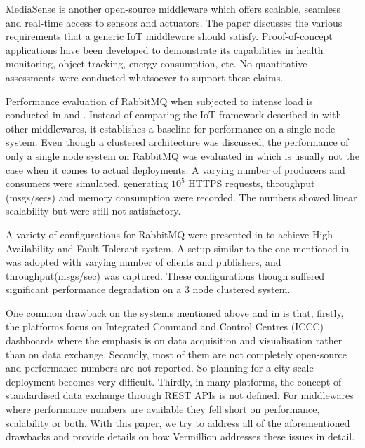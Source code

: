\documentclass[conference, 10pt]{IEEEtran}
\begin{document}
MediaSense \cite{kanter2012mediasense} is another open-source middleware which offers scalable, seamless and real-time access to sensors and actuators. The paper discusses the various requirements that a generic IoT middleware should satisfy. Proof-of-concept applications have been developed to demonstrate its capabilities in health monitoring, object-tracking, energy consumption, etc. No quantitative assessments were conducted whatsoever to support these claims. 

Performance evaluation of RabbitMQ when subjected to intense load is conducted in \cite{vandikas2014performance} and \cite{rostanski2014evaluation}. Instead of comparing the IoT-framework described in \cite{vandikas2014performance} with other middlewares, it establishes a baseline for performance on a single node system. 
Even though a clustered architecture was discussed, the performance of only a single node system on RabbitMQ was evaluated in \cite{vandikas2014performance} which is usually not the case when it comes to actual deployments. A varying number of producers and consumers were simulated, generating $10^5$ HTTPS requests, throughput (msgs/secs)  and memory consumption were recorded. The numbers showed linear scalability but were still not satisfactory.

A variety of configurations for RabbitMQ were presented in\cite{rostanski2014evaluation} to achieve High Availability and Fault-Tolerant system. A setup similar to the one mentioned in \cite{vandikas2014performance} was adopted with varying number of clients and publishers, and throughput(msgs/sec) was captured. These configurations though suffered significant performance degradation on a 3 node clustered system.

One common drawback on the systems mentioned above and in \cite{ray2016survey,farahzadi2018middleware} is that, firstly, the platforms focus on Integrated Command and Control Centres (ICCC) dashboards where the emphasis is on data acquisition and visualisation rather than on data exchange. Secondly, most of them are not completely open-source and performance numbers are not reported. So planning for a city-scale deployment becomes very difficult. Thirdly, in many platforms, the concept of standardised data exchange through REST APIs is not defined.
For middlewares where performance numbers are available \cite{zhiliang2011soa}\cite{da2018performance}\cite{cardoso2017benchmarking}\cite{vandikas2014performance}\cite{rostanski2014evaluation} they fell short on performance, scalability or both. With this paper, we try to address all of the aforementioned drawbacks and provide details on how Vermillion addresses these issues in detail.
\end{document}
